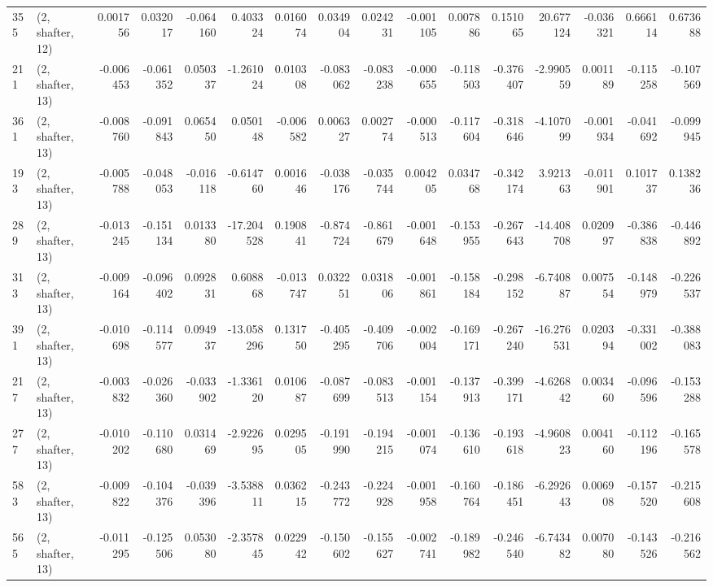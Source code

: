 \begin{tabular}{llrrrrrrrrrrrrrr}
355 &  (2, shafter, 12) &   0.001756 &  0.032017 & -0.064160 &    0.403324 &  0.016074 &   0.034904 &   0.024231 & -0.001105 &  0.007886 &  0.151065 &   20.677124 & -0.036321 &   0.666114 &   0.673688 \\
211 &  (2, shafter, 13) &  -0.006453 & -0.061352 &  0.050337 &   -1.261024 &  0.010308 &  -0.083062 &  -0.083238 & -0.000655 & -0.118503 & -0.376407 &   -2.990559 &  0.001189 &  -0.115258 &  -0.107569 \\
361 &  (2, shafter, 13) &  -0.008760 & -0.091843 &  0.065450 &    0.050148 & -0.006582 &   0.006327 &   0.002774 & -0.000513 & -0.117604 & -0.318646 &   -4.107099 & -0.001934 &  -0.041692 &  -0.099945 \\
193 &  (2, shafter, 13) &  -0.005788 & -0.048053 & -0.016118 &   -0.614760 &  0.001646 &  -0.038176 &  -0.035744 &  0.004205 &  0.034768 & -0.342174 &    3.921363 & -0.011901 &   0.101737 &   0.138236 \\
289 &  (2, shafter, 13) &  -0.013245 & -0.151134 &  0.013380 &  -17.204528 &  0.190841 &  -0.874724 &  -0.861679 & -0.001648 & -0.153955 & -0.267643 &  -14.408708 &  0.020997 &  -0.386838 &  -0.446892 \\
313 &  (2, shafter, 13) &  -0.009164 & -0.096402 &  0.092831 &    0.608868 & -0.013747 &   0.032251 &   0.031806 & -0.001861 & -0.158184 & -0.298152 &   -6.740887 &  0.007554 &  -0.148979 &  -0.226537 \\
391 &  (2, shafter, 13) &  -0.010698 & -0.114577 &  0.094937 &  -13.058296 &  0.131750 &  -0.405295 &  -0.409706 & -0.002004 & -0.169171 & -0.267240 &  -16.276531 &  0.020394 &  -0.331002 &  -0.388083 \\
217 &  (2, shafter, 13) &  -0.003832 & -0.026360 & -0.033902 &   -1.336120 &  0.010687 &  -0.087699 &  -0.083513 & -0.001154 & -0.137913 & -0.399171 &   -4.626842 &  0.003460 &  -0.096596 &  -0.153288 \\
277 &  (2, shafter, 13) &  -0.010202 & -0.110680 &  0.031469 &   -2.922695 &  0.029505 &  -0.191990 &  -0.194215 & -0.001074 & -0.136610 & -0.193618 &   -4.960823 &  0.004160 &  -0.112196 &  -0.165578 \\
583 &  (2, shafter, 13) &  -0.009822 & -0.104376 & -0.039396 &   -3.538811 &  0.036215 &  -0.243772 &  -0.224928 & -0.001958 & -0.160764 & -0.186451 &   -6.292643 &  0.006908 &  -0.157520 &  -0.215608 \\
565 &  (2, shafter, 13) &  -0.011295 & -0.125506 &  0.053080 &   -2.357845 &  0.022942 &  -0.150602 &  -0.155627 & -0.002741 & -0.189982 & -0.246540 &   -6.743482 &  0.007080 &  -0.143526 &  -0.216562 \\

\end{tabular}
